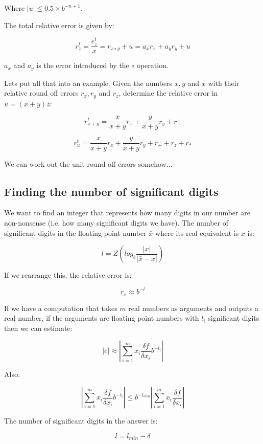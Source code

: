 Where $|u| \leq 0.5 \times b^{-n + 1}$.

The total relative error is given by:

\[
  r^t_z = \frac{e^t_z}{x} = r_{x \circ y} + u = a_xr_x + a_yr_y + u
\]

$a_x$ and $a_y$ is the error introduced by the $\circ$ operation.

Lets put all that into an example. Given the numbers $x,y$ and $x$ with their
relative round off errors $r_x, r_y$ and $r_z$, determine the relative error in
$u = (x + y)z$:

\[
  r^t_{x + y} = \frac{x}{x + y}r_x + \frac{y}{x + y}r_y + r_+
\]


\[
  r^t_{u} = \frac{x}{x + y}r_x + \frac{y}{x + y}r_y + r_+ + r_z + r_*
\]

We can work out the unit round off errors somehow...



\subsection{Finding the number of significant digits}

We want to find an integer that represents how many digits in our number are
non-nonsense (i.e. how many significant digits we have). The number of
significant digits in the floating point number $\bar{x}$ where its real
equivalent is $x$ is:


\[
  l = Z(log_b\frac{|x|}{|\bar{x} - x|})
\]

If we rearrange this, the relative error is:

\[
  r_x \approx b^{-l}
\]

If we have a computation that takes $m$ real numbers as arguments and outputs a
real number, if the arguments are floating point numbers with $l_i$ significant
digits then we can estimate:

\[
  |e| \approx |\sum^m_{i=1} x_i\frac{\delta f}{\delta x_i}b^{-l_i}|
\]

Also:

\[
  |\sum^m_{i=1} x_i\frac{\delta f}{\delta x_i}b^{-l_i}|
    \leq b^{-l_{min}}|\sum^m_{i=1} x_i\frac{\delta f}{\delta x_i}|
\]

The number of significant digits in the answer is:

\[
  l = l_{min} - \delta
\]

